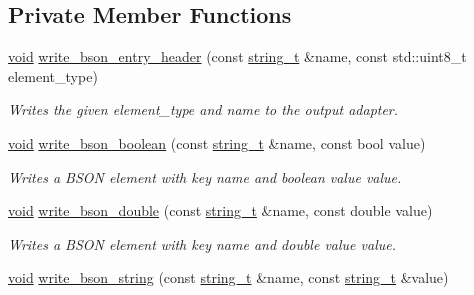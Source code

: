 \subsection*{Private Member Functions}
\begin{DoxyCompactItemize}
\item 
\mbox{\hyperlink{namespacenlohmann_1_1detail_a59fca69799f6b9e366710cb9043aa77d}{void}} \mbox{\hyperlink{classnlohmann_1_1detail_1_1binary__writer_a1b5b7f5c03b1f8b1f59ea61db9634108}{write\+\_\+bson\+\_\+entry\+\_\+header}} (const \mbox{\hyperlink{classnlohmann_1_1detail_1_1binary__writer_a29f2ae7a5c4a8c1dae47b3b2310de8a8}{string\+\_\+t}} \&name, const std\+::uint8\+\_\+t element\+\_\+type)
\begin{DoxyCompactList}\small\item\em Writes the given {\itshape element\+\_\+type} and {\itshape name} to the output adapter. \end{DoxyCompactList}\item 
\mbox{\hyperlink{namespacenlohmann_1_1detail_a59fca69799f6b9e366710cb9043aa77d}{void}} \mbox{\hyperlink{classnlohmann_1_1detail_1_1binary__writer_ae099435e1df3096e0fc78333282f8f67}{write\+\_\+bson\+\_\+boolean}} (const \mbox{\hyperlink{classnlohmann_1_1detail_1_1binary__writer_a29f2ae7a5c4a8c1dae47b3b2310de8a8}{string\+\_\+t}} \&name, const bool value)
\begin{DoxyCompactList}\small\item\em Writes a B\+S\+ON element with key {\itshape name} and boolean value {\itshape value}. \end{DoxyCompactList}\item 
\mbox{\hyperlink{namespacenlohmann_1_1detail_a59fca69799f6b9e366710cb9043aa77d}{void}} \mbox{\hyperlink{classnlohmann_1_1detail_1_1binary__writer_a263ec18815467bb9919021ef126919ca}{write\+\_\+bson\+\_\+double}} (const \mbox{\hyperlink{classnlohmann_1_1detail_1_1binary__writer_a29f2ae7a5c4a8c1dae47b3b2310de8a8}{string\+\_\+t}} \&name, const double value)
\begin{DoxyCompactList}\small\item\em Writes a B\+S\+ON element with key {\itshape name} and double value {\itshape value}. \end{DoxyCompactList}\item 
\mbox{\hyperlink{namespacenlohmann_1_1detail_a59fca69799f6b9e366710cb9043aa77d}{void}} \mbox{\hyperlink{classnlohmann_1_1detail_1_1binary__writer_a5e6574416915208fc035b57338ae3252}{write\+\_\+bson\+\_\+string}} (const \mbox{\hyperlink{classnlohmann_1_1detail_1_1binary__writer_a29f2ae7a5c4a8c1dae47b3b2310de8a8}{string\+\_\+t}} \&name, const \mbox{\hyperlink{classnlohmann_1_1detail_1_1binary__writer_a29f2ae7a5c4a8c1dae47b3b2310de8a8}{string\+\_\+t}} \&value)

\end{DoxyCompactItemize}
